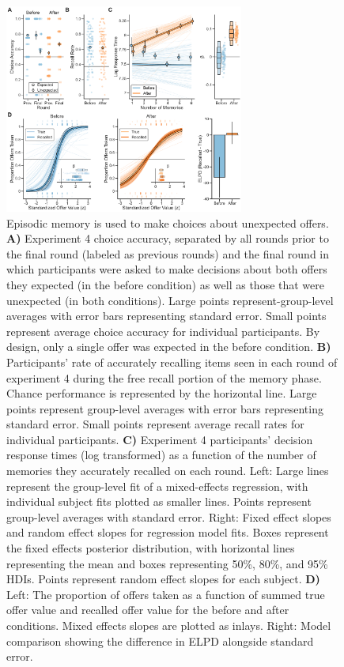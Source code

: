\documentclass[10pt,letterpaper]{article}
\begin{document}
\begin{figure}[t]
    \centering
    \includegraphics[width=0.7\textwidth]{figures/Figure4.pdf}
    \caption{Episodic memory is used to make choices about unexpected offers. \textbf{A)} Experiment 4 choice accuracy, separated by all rounds prior to the final round (labeled as previous rounds) and the final round in which participants were asked to make decisions about both offers they expected (in the before condition) as well as those that were unexpected (in both conditions). Large points represent-group-level averages with error bars representing standard error. Small points represent average choice accuracy for individual participants. By design, only a single offer was expected in the before condition. \textbf{B)} Participants' rate of accurately recalling items seen in each round of experiment 4 during the free recall portion of the memory phase. Chance performance is represented by the horizontal line. Large points represent group-level averages with error bars representing standard error. Small points represent average recall rates for individual participants. \textbf{C)} Experiment 4 participants' decision response times (log transformed) as a function of the number of memories they accurately recalled on each round. Left: Large lines represent the group-level fit of a mixed-effects regression, with individual subject fits plotted as smaller lines. Points represent group-level averages with standard error. Right: Fixed effect slopes and random effect slopes for regression model fits. Boxes represent the 
    fixed effects posterior distribution, with horizontal lines representing the mean and boxes representing 50\%, 80\%, and 95\% HDIs. Points represent random effect slopes for each subject. \textbf{D)} Left: The proportion of offers taken as a function of summed true offer value and recalled offer value for the before and after conditions. Mixed effects slopes are plotted as inlays. Right: Model comparison showing the difference in ELPD alongside standard error.}
    \label{fig:figure4}
\end{figure}
\end{document}
